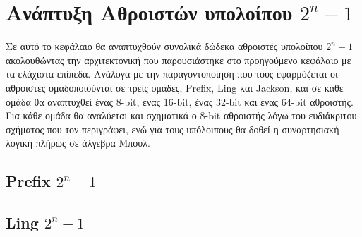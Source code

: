 \section{Ανάπτυξη Αθροιστών υπολοίπου $2^n-1$ }

Σε αυτό το κεφάλαιο θα αναπτυχθούν συνολικά δώδεκα αθροιστές υπολοίπου $2^n-1$
ακολουθώντας την αρχιτεκτονική που παρουσιάστηκε στο προηγούμενο κεφάλαιο 
με τα ελάχιστα επίπεδα. Ανάλογα με την παραγοντοποίηση που τους εφαρμόζεται 
οι αθροιστές ομαδοποιούνται σε τρείς ομάδες, Prefix, Ling και Jackson,
και σε κάθε ομάδα θα αναπτυχθεί ένας 8-bit, ένας 16-bit, ένας 32-bit και ένας 64-bit 
αθροιστής. Για κάθε ομάδα θα αναλύεται και σχηματικά ο 8-bit αθροιστής λόγω του 
ευδιάκριτου σχήματος που τον περιγράφει, ενώ για τους υπόλοιπους θα δοθεί η
συναρτησιακή λογική πλήρως σε άλγεβρα Μπουλ.

\subsection{Prefix $2^n-1$}


\subsection{Ling $2^n-1$}









